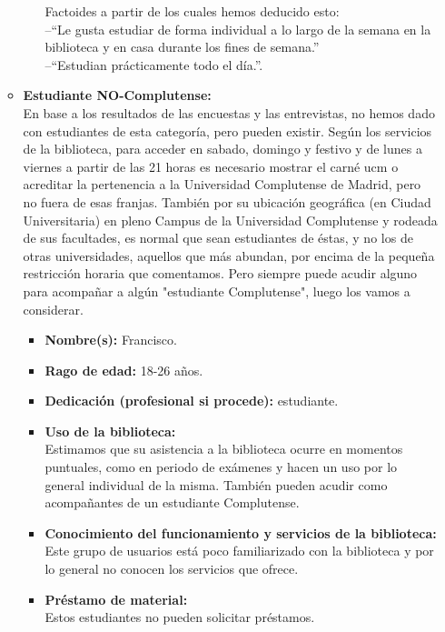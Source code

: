 \documentclass[12pt]{article}
\begin{document}
\begin{itemize}
\begin{itemize}
\begin{itemize}
			Factoides a partir de los cuales hemos deducido esto: \\--``Le gusta estudiar de forma individual a lo largo de la semana en la biblioteca y en casa durante los fines de semana.'' \\ --``Estudian prácticamente todo el día.''.

	\end{itemize}
	\item \textbf{Estudiante NO-Complutense:}\\
 En base a los resultados de las encuestas y las entrevistas, no hemos dado con estudiantes de esta categoría, pero pueden existir. Según los servicios de la biblioteca, para acceder en sabado, domingo y festivo y de lunes a viernes a partir de las 21 horas es necesario mostrar el carné ucm o acreditar la pertenencia a la Universidad Complutense de Madrid, pero no fuera de esas franjas. También por su ubicación geográfica (en Ciudad Universitaria) en pleno Campus de la Universidad Complutense y rodeada de sus facultades, es normal que sean estudiantes de  éstas, y no los de otras universidades, aquellos que más abundan, por encima de la pequeña restricción horaria que comentamos. Pero siempre puede acudir alguno para acompañar a algún "estudiante Complutense", luego los vamos a considerar.
	\begin{itemize}
	
		\item \textbf{Nombre(s):}  Francisco. \\
	\item \textbf{Rago de edad:} 18-26 años. \\
	\item \textbf{Dedicación (profesional si procede):} estudiante. \\
	
		\item \textbf{Uso de la biblioteca: \\}
			Estimamos que su asistencia a la biblioteca ocurre en momentos puntuales, como en periodo de exámenes y hacen un uso por lo general individual de la misma. También pueden acudir como acompañantes de un estudiante Complutense.

		\item \textbf{Conocimiento del funcionamiento y servicios de la biblioteca: \\}
			Este grupo de usuarios está poco familiarizado con la biblioteca y por lo general no conocen los servicios que ofrece.

		\item \textbf{Préstamo de material: \\}
			Estos estudiantes no pueden solicitar préstamos.


\end{itemize}
\end{itemize}
\end{itemize}
\end{document}
